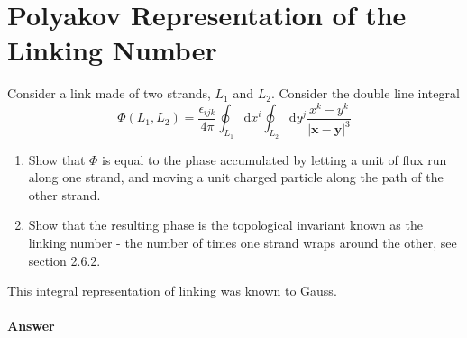 \documentclass{book}
\begin{document}
\section{Polyakov Representation of the Linking Number}
Consider a link made of two strands, $L_{1}$ and $L_{2}$. Consider the double line integral
\begin{equation*}
\Phi ( L_{1} ,L_{2}) =\frac{\epsilon _{ijk}}{4\pi }\oint _{L_{1}}\mathrm{d} x^{i}\oint _{L_{2}}\mathrm{d} y^{j}\frac{x^{k} -y^{k}}{|\boldsymbol{x} -\boldsymbol{y} |^{3}}
\end{equation*}
\begin{enumerate}
\item Show that $\Phi $ is equal to the phase accumulated by letting a unit of flux run along one strand, and moving a unit charged particle along the path of the other strand.
\item Show that the resulting phase is the topological invariant known as the linking number - the number of times one strand wraps around the other, see section 2.6.2.
\end{enumerate}

This integral representation of linking was known to Gauss.


\paragraph{Answer}
\end{document}
